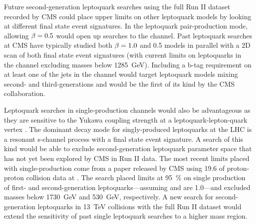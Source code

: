Future second-generation leptoquark searches using the full Run II dataset recorded by CMS could place upper limits on other leptoquark models by looking at different final state event signatures. In the leptoquark pair-production mode, allowing $\beta = 0.5$ would open up searches to the \HepProcess{\Pmu\Pnu\Pj\Pj} channel. Past leptoquark searches at CMS have typically studied both $\beta = 1.0$ and 0.5 models in parallel with a 2D scan of both final state event signatures (with current limits on leptoquarks in the \HepProcess{\Pmu\Pnu\Pj\Pj} channel excluding masses below \SI{1285}{\GeV}). Including a b-tag requirement on at least one of the jets in the \HepProcess{\Pmu\Pnu\Pj\Pj} channel would target leptoquark models mixing second- and third-generations and would be the first of its kind by the CMS collaboration. 

Leptoquark searches in single-production channels would also be advantageous as they are sensitive to the Yukawa coupling strength at a leptoquark-lepton-quark vertex \lambdaLQ. The dominant decay mode for singly-produced leptoquarks at the LHC is a resonant s-channel process with a \HepProcess{\Plepton\APlepton\Pj} final state event signature. A search of this kind would be able to exclude second-generation leptoquark parameter space that has not yet been explored by CMS in Run II data. The most recent limits placed with single-production come from a paper released by CMS using \SI{19.6}{\invfb} of proton-proton collision data at . The search placed limits at \SI{95}{\%} \CL on single production of first- and second-generation leptoquarks---assuming \lambdaLQ and \bfu are 1.0---and excluded masses below \SI{1730}{\GeV} and \SI{530}{\GeV}, respectively. A new search for second-generation leptoquarks in \SI{13}{\TeV} collisions with the full Run II dataset would extend the sensitivity of past single leptoquark searches to a higher mass region.

